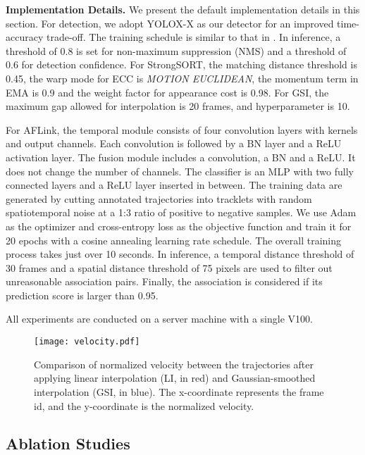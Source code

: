 \documentclass[lettersize,journal]{IEEEtran}
\begin{document}
\noindent \textbf{Implementation Details.}
We present the default implementation details in this section.
For detection, we adopt YOLOX-X \cite{ge2021yolox} as our detector for an improved time-accuracy trade-off. 
The training schedule is similar to that in \cite{zhang2022bytetrack}.
In inference, a threshold of 0.8 is set for non-maximum suppression (NMS) and a threshold of 0.6 for detection confidence.
For StrongSORT, the matching distance threshold is 0.45, the warp mode for ECC is \emph{MOTION EUCLIDEAN}, the momentum term  in EMA is 0.9 
and the weight factor for appearance cost  is 0.98.
For GSI, the maximum gap allowed for interpolation is 20 frames, and hyperparameter  is 10.

For AFLink, the temporal module consists of four convolution layers with  kernels and  output channels.
Each convolution is followed by a BN layer and a ReLU activation layer.
The fusion module includes a  convolution, a BN and a ReLU.
It does not change the number of channels.
The classifier is an MLP with two fully connected layers and a ReLU layer inserted in between.
The training data are generated by cutting annotated trajectories into tracklets with random spatiotemporal noise at a 1:3 ratio of positive to negative samples.
We use Adam as the optimizer \cite{2014Adam} and cross-entropy loss as the objective function and train it for 20 epochs with a cosine annealing learning rate schedule.
The overall training process takes just over 10 seconds.
In inference, a temporal distance threshold of 30 frames and a spatial distance threshold of 75 pixels are used to filter out unreasonable association pairs.
Finally, the association is considered if its prediction score is larger than 0.95.

All experiments are conducted on a server machine with a single V100.

\begin{figure*}[t]
  \centering
  \texttt{[image: velocity.pdf]}
  \caption{
    Comparison of normalized velocity between the trajectories 
    after applying linear interpolation (LI, in red) and Gaussian-smoothed interpolation (GSI, in blue).
    The x-coordinate represents the frame id, and the y-coordinate is the normalized velocity.
  }
  \label{figure_velocity}
\end{figure*}

\subsection{Ablation Studies}
\end{document}

